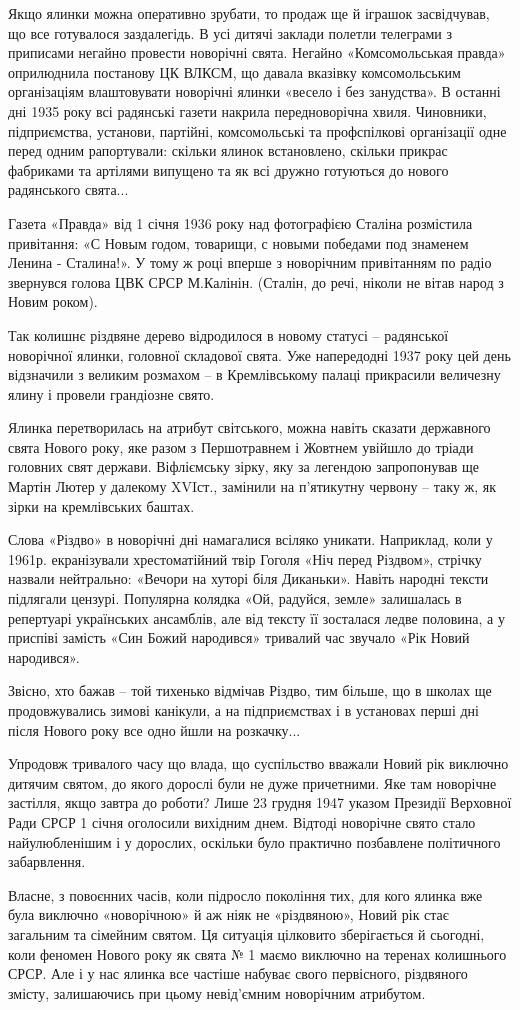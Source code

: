 Якщо ялинки можна оперативно зрубати, то продаж ще й іграшок засвідчував, що
все готувалося заздалегідь. В усі дитячі заклади полетли телеграми з приписами
негайно провести новорічні свята. Негайно «Комсомольськая правда»  оприлюднила
постанову ЦК ВЛКСМ, що давала вказівку комсомольським організаціям влаштовувати
новорічні ялинки «весело і без занудства». В останні дні 1935 року всі
радянські газети накрила передноворічна хвиля. Чиновники, підприємства,
установи, партійні, комсомольські та профспілкові організації одне перед одним
рапортували: скільки ялинок встановлено, скільки прикрас фабриками та артілями
випущено та як всі дружно готуються до нового радянського свята...

Газета «Правда» від 1 січня 1936 року над фотографією Сталіна розмістила
привітання: «С Новым годом, товарищи, с новыми победами под знаменем Ленина -
Сталина!». У тому ж році вперше з новорічним привітанням по радіо звернувся
голова ЦВК СРСР М.Калінін. (Сталін, до речі, ніколи не вітав народ з Новим
роком).

Так колишнє різдвяне дерево відродилося в новому статусі – радянської
новорічної ялинки, головної складової свята. Уже напередодні 1937 року цей день
відзначили з великим розмахом – в Кремлівському палаці прикрасили величезну
ялину і провели грандіозне свято.

Ялинка перетворилась на атрибут світського, можна навіть сказати державного
свята Нового року, яке разом з Першотравнем і Жовтнем увійшло до тріади
головних свят держави. Віфліємську зірку, яку за легендою запропонував ще
Мартін Лютер у далекому XVIст., замінили на п’ятикутну червону – таку ж, як
зірки на кремлівських баштах. 

Слова «Різдво» в новорічні дні намагалися всіляко уникати. Наприклад, коли у
1961р. екранізували хрестоматійний твір Гоголя «Ніч перед Різдвом», стрічку
назвали нейтрально: «Вечори на хуторі біля Диканьки». Навіть народні тексти
підлягали цензурі. Популярна колядка «Ой, радуйся, земле» залишалась в
репертуарі українських ансамблів, але від тексту її зосталася ледве половина, а
у приспіві замість «Син Божий народився» тривалий час звучало «Рік Новий
народився». 

Звісно, хто бажав – той тихенько відмічав Різдво, тим більше, що в школах ще
продовжувались зимові канікули, а на підприємствах і в установах перші дні
після Нового року все одно йшли на розкачку...

Упродовж тривалого часу що влада, що суспільство вважали Новий рік виключно
дитячим святом, до якого дорослі були не дуже причетними. Яке там новорічне
застілля, якщо завтра до роботи? Лише 23 грудня 1947 указом Президії Верховної
Ради СРСР 1 січня оголосили вихідним днем. Відтоді новорічне свято стало
найулюбленішим і у дорослих, оскільки було практично позбавлене політичного
забарвлення.

Власне, з повоєнних часів, коли підросло покоління тих, для кого  ялинка вже
була виключно «новорічною» й аж ніяк не «різдвяною», Новий рік стає загальним
та сімейним святом. Ця ситуація цілковито зберігається й сьогодні, коли феномен
Нового року як свята № 1 маємо виключно на теренах колишнього СРСР. Але і у нас
ялинка все частіше набуває свого первісного, різдвяного змісту, залишаючись при
цьому невід’ємним новорічним атрибутом.

